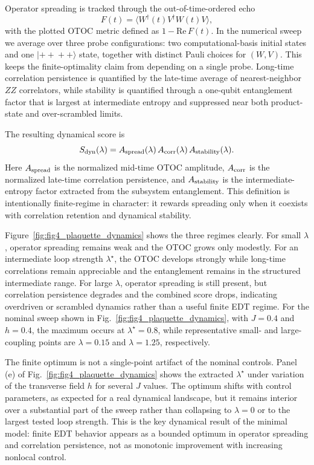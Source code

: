 \documentclass[twocolumn,10pt]{article}
\begin{document}
Operator spreading is tracked through the out-of-time-ordered echo
\begin{equation}
F(t)
=
\langle W^\dagger(t)V^\dagger W(t)V\rangle,
\end{equation}
with the plotted OTOC metric defined as $1-\mathrm{Re}\,F(t)$. In the numerical sweep we average over three probe configurations: two computational-basis initial states and one $|+\!+\!+\!+\rangle$ state, together with distinct Pauli choices for $(W,V)$. This keeps the finite-optimality claim from depending on a single probe. Long-time correlation persistence is quantified by the late-time average of nearest-neighbor $ZZ$ correlators, while stability is quantified through a one-qubit entanglement factor that is largest at intermediate entropy and suppressed near both product-state and over-scrambled limits.

The resulting dynamical score is
\begin{equation}
S_{\rm dyn}(\lambda)
=
A_{\rm spread}(\lambda)\,
A_{\rm corr}(\lambda)\,
A_{\rm stability}(\lambda).
\end{equation}
Here $A_{\rm spread}$ is the normalized mid-time OTOC amplitude, $A_{\rm corr}$ is the normalized late-time correlation persistence, and $A_{\rm stability}$ is the intermediate-entropy factor extracted from the subsystem entanglement. This definition is intentionally finite-regime in character: it rewards spreading only when it coexists with correlation retention and dynamical stability.

Figure~\ref{fig:fig4_plaquette_dynamics} shows the three regimes clearly. For small $\lambda$, operator spreading remains weak and the OTOC grows only modestly. For an intermediate loop strength $\lambda^\star$, the OTOC develops strongly while long-time correlations remain appreciable and the entanglement remains in the structured intermediate range. For large $\lambda$, operator spreading is still present, but correlation persistence degrades and the combined score drops, indicating overdriven or scrambled dynamics rather than a useful finite EDT regime. For the nominal sweep shown in Fig.~\ref{fig:fig4_plaquette_dynamics}, with $J=0.4$ and $h=0.4$, the maximum occurs at $\lambda^\star = 0.8$, while representative small- and large-coupling points are $\lambda = 0.15$ and $\lambda = 1.25$, respectively.

The finite optimum is not a single-point artifact of the nominal controls. Panel (e) of Fig.~\ref{fig:fig4_plaquette_dynamics} shows the extracted $\lambda^\star$ under variation of the transverse field $h$ for several $J$ values. The optimum shifts with control parameters, as expected for a real dynamical landscape, but it remains interior over a substantial part of the sweep rather than collapsing to $\lambda=0$ or to the largest tested loop strength. This is the key dynamical result of the minimal model: finite EDT behavior appears as a bounded optimum in operator spreading and correlation persistence, not as monotonic improvement with increasing nonlocal control.
\end{document}
